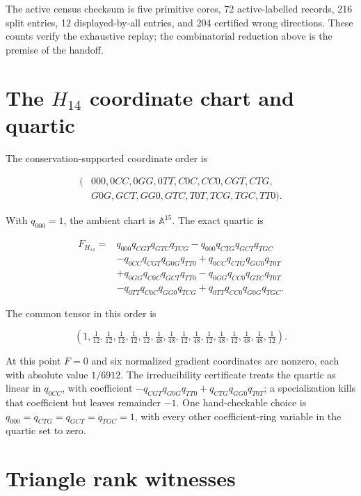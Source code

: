 \documentclass[10pt]{article}
\begin{document}
The active census checksum is five primitive cores, 72 active-labelled
records, 216 split entries, 12 displayed-by-all entries, and 204 certified
wrong directions.  These counts verify the exhaustive replay; the
combinatorial reduction above is the premise of the handoff.

\section{The \texorpdfstring{\(H_{14}\)}{H14} coordinate chart and quartic}

The conservation-supported coordinate order is

\begin{align*}
(&000,0CC,0GG,0TT,C0C,CC0,CGT,CTG,\\
 &G0G,GCT,GG0,GTC,T0T,TCG,TGC,TT0).
\end{align*}

With \(q_{000}=1\), the ambient chart is \(\mathbb A^{15}\).  The exact
quartic is

\begin{align*}
F_{H_{14}}={}&q_{000}q_{CGT}q_{GTC}q_{TCG}
-q_{000}q_{CTG}q_{GCT}q_{TGC}\\
&-q_{0CC}q_{CGT}q_{G0G}q_{TT0}
+q_{0CC}q_{CTG}q_{GG0}q_{T0T}\\
&+q_{0GG}q_{C0C}q_{GCT}q_{TT0}
-q_{0GG}q_{CC0}q_{GTC}q_{T0T}\\
&-q_{0TT}q_{C0C}q_{GG0}q_{TCG}
+q_{0TT}q_{CC0}q_{G0G}q_{TGC}.
\end{align*}

The common tensor in this order is

\[
\left(1,\tfrac1{12},\tfrac1{12},\tfrac1{12},\tfrac1{12},\tfrac1{12},
\tfrac1{48},\tfrac1{48},\tfrac1{12},\tfrac1{48},\tfrac1{12},
\tfrac1{48},\tfrac1{12},\tfrac1{48},\tfrac1{48},\tfrac1{12}\right).
\]

At this point \(F=0\) and six normalized gradient coordinates are nonzero,
each with absolute value \(1/6912\).  The irreducibility certificate treats
the quartic as linear in \(q_{0CC}\), with coefficient
\(-q_{CGT}q_{G0G}q_{TT0}+q_{CTG}q_{GG0}q_{T0T}\); a specialization kills
that coefficient but leaves remainder \(-1\).  One hand-checkable choice is
\(q_{000}=q_{CTG}=q_{GCT}=q_{TGC}=1\), with every other coefficient-ring
variable in the quartic set to zero.

\section{Triangle rank witnesses}
\end{document}
